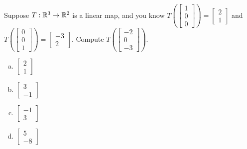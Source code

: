 \begin{activity}{5}
Suppose \(T: \mathbb{R}^3 \rightarrow \mathbb{R}^2\) is a linear map, and you know
\(
  T\left(\begin{bmatrix} 1 \\ 0 \\ 0 \end{bmatrix} \right)
=
  \begin{bmatrix} 2 \\ 1 \end{bmatrix}
\)
and
\(
  T\left(\begin{bmatrix} 0 \\ 0 \\ 1 \end{bmatrix} \right)
=
  \begin{bmatrix} -3 \\ 2 \end{bmatrix}
\).
Compute \(T\left(\begin{bmatrix} -2 \\ 0 \\ -3 \end{bmatrix}\right)\).
\begin{multicols}{2}
\begin{enumerate}[(a)]
\item \(\begin{bmatrix} 2 \\ 1\end{bmatrix}\)
\item \(\begin{bmatrix} 3 \\ -1 \end{bmatrix}\)
\item \(\begin{bmatrix} -1 \\ 3 \end{bmatrix}\)
\item \(\begin{bmatrix} 5 \\ -8 \end{bmatrix}\)
\end{enumerate}
\end{multicols}
\end{activity}

